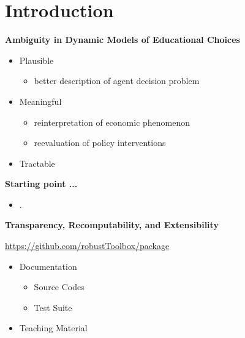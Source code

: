 \section{Introduction}
\begin{frame}
\textbf{Ambiguity in Dynamic Models of Educational Choices}\vspace{0.5cm}
\begin{itemize}\setlength\itemsep{1em}
\item Plausible
\begin{itemize}\setlength\itemsep{1em}
\item better description of agent decision problem
\end{itemize}
\item Meaningful\medskip
\begin{itemize}\setlength\itemsep{1em}
\item reinterpretation of economic phenomenon
\item reevaluation of policy interventions
\end{itemize}
\item Tractable
\end{itemize}
\end{frame}
\begin{frame}
\textbf{Starting point ...}\vspace{0.3cm}
\begin{itemize}
\item[] .
\end{itemize}
\end{frame}
\begin{frame}\textbf{Transparency, Recomputability, and Extensibility}

\begin{center}
\url{https://github.com/robustToolbox/package}
\end{center}

\begin{itemize}\setlength\itemsep{1em}
\item Documentation\medskip
\begin{itemize}\setlength\itemsep{1em}
\item Source Codes
\item Test Suite
\end{itemize}
\item Teaching Material\medskip
\end{itemize}\end{frame}
